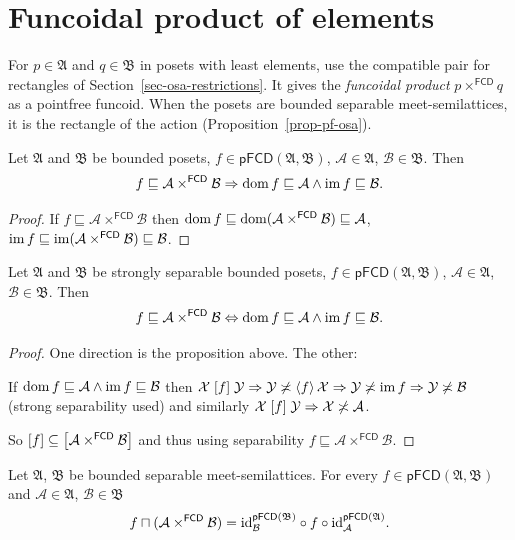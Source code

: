 \section{Funcoidal product of elements}
For $p\in\mathfrak A$ and $q\in\mathfrak B$ in posets with least
elements, use the compatible pair for rectangles of
Section~\ref{sec-osa-restrictions}. It gives the \emph{funcoidal
product} $p\times^{\mathsf{FCD}}q$ as a pointfree funcoid. When
the posets are bounded separable meet-semilattices, it is the
rectangle of the action (Proposition~\ref{prop-pf-osa}).

\begin{prop}
Let $\mathfrak{A}$ and $\mathfrak{B}$ be bounded posets,
$f\in\mathsf{pFCD}(\mathfrak{A},\mathfrak{B})$, $\mathcal{A}\in\mathfrak{A}$,
$\mathcal{B}\in\mathfrak{B}$. Then
\[
f\sqsubseteq\mathcal{A}\times^{\mathsf{FCD}}\mathcal{B}\Rightarrow\operatorname{dom} f\sqsubseteq\mathcal{A}\wedge\operatorname{im} f\sqsubseteq\mathcal{B}.
\]
\end{prop}
\begin{proof}
If $f\sqsubseteq\mathcal{A}\times^{\mathsf{FCD}}\mathcal{B}$ then
$\operatorname{dom} f\sqsubseteq\operatorname{dom}(\mathcal{A}\times^{\mathsf{FCD}}\mathcal{B})\sqsubseteq\mathcal{A}$,
$\operatorname{im} f\sqsubseteq\operatorname{im}(\mathcal{A}\times^{\mathsf{FCD}}\mathcal{B})\sqsubseteq\mathcal{B}$.\end{proof}
\begin{thm}\label{pf-im-dom}
Let $\mathfrak{A}$ and $\mathfrak{B}$ be strongly separable bounded posets,
$f\in\mathsf{pFCD}(\mathfrak{A},\mathfrak{B})$, $\mathcal{A}\in\mathfrak{A}$,
$\mathcal{B}\in\mathfrak{B}$. Then
\[
f\sqsubseteq\mathcal{A}\times^{\mathsf{FCD}}\mathcal{B}\Leftrightarrow\operatorname{dom} f\sqsubseteq\mathcal{A}\wedge\operatorname{im} f\sqsubseteq\mathcal{B}.
\]
\end{thm}
\begin{proof}
One direction is the proposition above. The other:

If $\operatorname{dom} f\sqsubseteq\mathcal{A}\wedge\operatorname{im} f\sqsubseteq\mathcal{B}$
then $\mathcal{X}\mathrel{\left[f\right]}\mathcal{Y}\Rightarrow\mathcal{Y}\not\asymp\left\langle f\right\rangle\mathcal{X}\Rightarrow\mathcal{Y}\not\asymp\operatorname{im} f\Rightarrow\mathcal{Y}\not\asymp\mathcal{B}$
(strong separability used)
and similarly $\mathcal{X}\mathrel{\left[f\right]}\mathcal{Y}\Rightarrow\mathcal{X}\not\asymp\mathcal{A}$.

So $\mathord{\mathrel{\left[f\right]}}\subseteq\mathord{\mathrel{\left[\mathcal{A}\times^{\mathsf{FCD}}\mathcal{B}\right]}}$
and thus using separability $f\sqsubseteq\mathcal{A}\times^{\mathsf{FCD}}\mathcal{B}$.\end{proof}
\begin{thm}
Let $\mathfrak{A}$, $\mathfrak{B}$ be bounded separable meet-semilattices. For every $f\in\mathsf{pFCD}(\mathfrak{A},\mathfrak{B})$
and $\mathcal{A}\in\mathfrak{A}$, $\mathcal{B}\in\mathfrak{B}$ 
\[
f\sqcap(\mathcal{A}\times^{\mathsf{FCD}}\mathcal{B})={\operatorname{id}}_{\mathcal{B}}^{\mathsf{pFCD}(\mathfrak{B})}\circ f\circ{\operatorname{id}}_{\mathcal{A}}^{\mathsf{pFCD}(\mathfrak{A})}.
\]
\end{thm}
